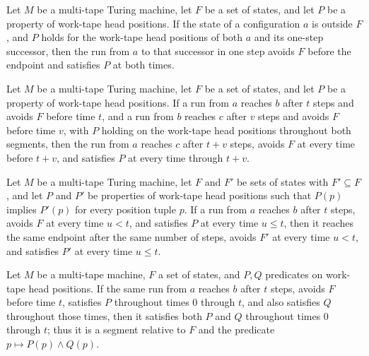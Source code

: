 \begin{theorem}
\label{Turing.Segment.one}
\leanok
{}
Let $M$ be a multi-tape Turing machine, let $F$ be a set of states, and let $P$ be a
property of work-tape head positions. If the state of a configuration $a$ is outside
$F$, and $P$ holds for the work-tape head positions of both $a$ and its one-step
successor, then the run from $a$ to that successor in one step avoids $F$ before the
endpoint and satisfies $P$ at both times.
\end{theorem}

\begin{theorem}
\label{Turing.Segment.trans}
\leanok
{}
Let $M$ be a multi-tape Turing machine, let $F$ be a set of states, and let $P$ be a
property of work-tape head positions. If a run from $a$ reaches $b$ after $t$ steps and
avoids $F$ before time $t$, and a run from $b$ reaches $c$ after $v$ steps and avoids
$F$ before time $v$, with $P$ holding on the work-tape head positions throughout both
segments, then the run from $a$ reaches $c$ after $t+v$ steps, avoids $F$ at every time
before $t+v$, and satisfies $P$ at every time through $t+v$.
\end{theorem}

\begin{theorem}
\label{Turing.Segment.mono}
\leanok
{}
Let $M$ be a multi-tape Turing machine, let $F$ and $F'$ be sets of states with
$F'\subseteq F$, and let $P$ and $P'$ be properties of work-tape head positions such
that $P(p)$ implies $P'(p)$ for every position tuple $p$. If a run from $a$ reaches $b$
after $t$ steps, avoids $F$ at every time $u<t$, and satisfies $P$ at every time $u\le
t$, then it reaches the same endpoint after the same number of steps, avoids $F'$ at
every time $u<t$, and satisfies $P'$ at every time $u\le t$.
\end{theorem}

\begin{theorem}
\label{Turing.Segment.and}
\leanok
{}
Let $M$ be a multi-tape machine, $F$ a set of states, and $P,Q$ predicates on work-tape
head positions. If the same run from $a$ reaches $b$ after $t$ steps, avoids $F$ before
time $t$, satisfies $P$ throughout times $0$ through $t$, and also satisfies $Q$
throughout those times, then it satisfies both $P$ and $Q$ throughout times $0$ through
$t$; thus it is a segment relative to $F$ and the predicate $p\mapsto P(p)\land Q(p)$.
\end{theorem}

